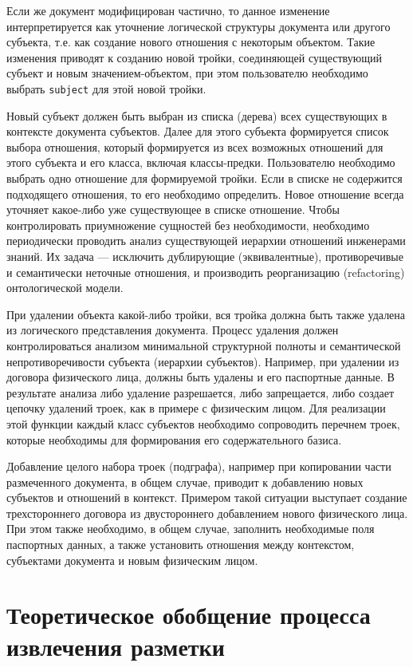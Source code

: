 \documentclass[utf8]{../IncArticle}
\begin{document}
Если же документ модифицирован частично, то данное изменение
интерпретируется как уточнение логической структуры документа или
другого субъекта, т.е. как создание нового отношения с некоторым объектом.
Такие изменения приводят к созданию новой тройки, соединяющей
существующий субъект и новым значением-объектом, при этом пользователю
необходимо выбрать \texttt{subject} для этой новой тройки.

Новый субъект должен быть выбран из списка (дерева) всех существующих
в контексте документа субъектов.  Далее для этого субъекта формируется
список выбора отношения, который формируется из всех возможных
отношений для этого субъекта и его класса, включая классы-предки.
Пользователю необходимо выбрать одно отношение для формируемой тройки.
Если в списке не содержится подходящего отношения, то его необходимо
определить.  Новое отношение всегда уточняет какое-либо уже
существующее в списке отношение.  Чтобы контролировать приумножение
сущностей без необходимости, необходимо периодически проводить анализ
существующей иерархии отношений инженерами знаний.  Их задача ---
исключить дублирующие (эквивалентные), противоречивые и семантически
неточные отношения, и производить реорганизацию (refactoring)
онтологической модели.

При удалении объекта какой-либо тройки, вся тройка должна быть также
удалена из логического представления документа.  Процесс удаления
должен контролироваться анализом минимальной структурной полноты и
семантической непротиворечивости субъекта (иерархии субъектов).
Например, при удалении из договора физического лица, должны быть
удалены и его паспортные данные. В результате анализа либо удаление
разрешается, либо запрещается, либо создает цепочку удалений троек,
как в примере с физическим лицом.  Для реализации этой функции каждый
класс субъектов необходимо сопроводить перечнем троек, которые
необходимы для формирования его содержательного базиса.

Добавление целого набора троек (подграфа), например при копировании
части размеченного документа, в общем случае, приводит к
добавлению новых субъектов и отношений в контекст.  Примером такой
ситуации выступает создание трехстороннего договора из двустороннего
добавлением нового физического лица.  При этом также необходимо, в
общем случае, заполнить необходимые поля паспортных данных, а также
установить отношения между контекстом, субъектами документа и новым
физическим лицом.

\section{Теоретическое обобщение процесса извлечения разметки}
\end{document}
